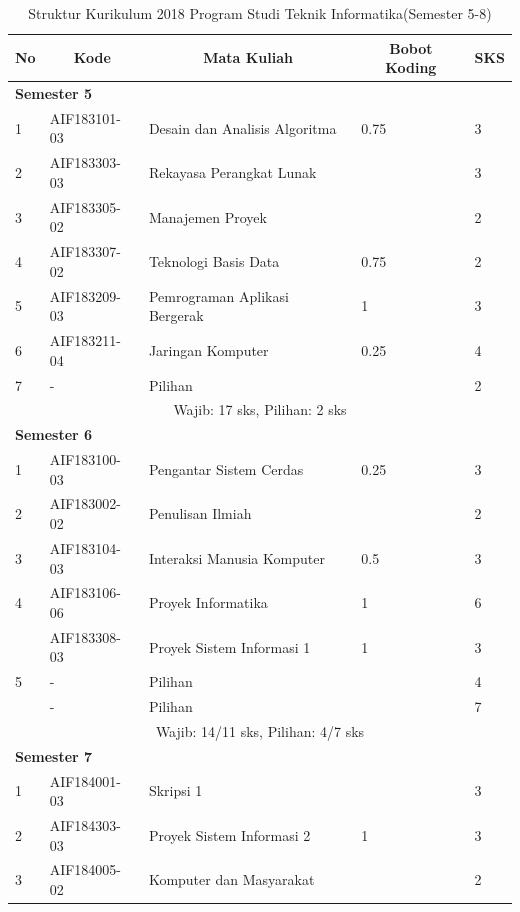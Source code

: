 \begin{table}[H]
	\caption{Struktur Kurikulum 2018 Program Studi Teknik Informatika(Semester 5-8)}
	\centering
		\begin{tabular}{|p{0.5cm}|p{2.85cm}|p{4.95cm}|p{2.7cm}|p{2.7cm}|}
			\hline
			\multicolumn{1}{|c|}{\textbf{No}} & \multicolumn{1}{c|}{\textbf{Kode}} & \multicolumn{1}{c|}{\textbf{Mata Kuliah}} & \multicolumn{1}{c|}{\textbf{Bobot Koding}} & \multicolumn{1}{c|}{\textbf{SKS}} \\ \hline
			\multicolumn{5}{|l|}{\textbf{Semester 5}} \\ \hline
			1 &	AIF183101-03 &	Desain dan Analisis Algoritma &	0.75 &	3  \\ \hline
			2	& AIF183303-03 &	Rekayasa Perangkat Lunak &  &	3  \\ \hline
			3	& AIF183305-02 &	Manajemen Proyek &  &	2  \\ \hline
			4 &	AIF183307-02 &	Teknologi Basis Data &	0.75 &	2  \\ \hline
			5 &	AIF183209-03 &	Pemrograman Aplikasi Bergerak &	1 &	3 \\ \hline
			6 &	AIF183211-04 &	Jaringan Komputer &	0.25 &	4  \\ \hline
			7 &	- &	Pilihan &	&	2  \\ \hline
			\multicolumn{5}{|c|}{Wajib: 17 sks, Pilihan: 2 sks} \\ \hline
			\multicolumn{5}{|l|}{\textbf{Semester 6}} \\ \hline
			1	& AIF183100-03 &	Pengantar Sistem Cerdas &	0.25 &	3  \\ \hline
			2	& AIF183002-02 &	Penulisan Ilmiah &  &	2  \\ \hline
			3	& AIF183104-03 &	Interaksi Manusia Komputer &	0.5 &	3  \\ \hline
			4	& AIF183106-06 &	Proyek Informatika &	1 &	6 \\ \hline
				& AIF183308-03 &	Proyek Sistem Informasi 1	& 1 &	3  \\ \hline
			5	& - &	Pilihan &	&	4  \\ \hline
				& - &	Pilihan	& &	7  \\ \hline
			\multicolumn{5}{|c|}{Wajib: 14/11 sks, Pilihan: 4/7 sks} \\ \hline
			\multicolumn{5}{|l|}{\textbf{Semester 7}} \\ \hline
			1	& AIF184001-03	& Skripsi 1	& &	3  \\ \hline
			2	& AIF184303-03	& Proyek Sistem Informasi 2 &	1 &	3  \\ \hline
			3	& AIF184005-02	& Komputer dan Masyarakat &	&	2  \\ \hline

\end{tabular}
\end{table}
